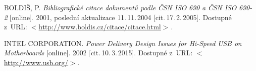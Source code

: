 \begin{literatura}{99}
	
    BOLDIŠ, P.
    \emph{Bibliografické citace dokumentů podle ČSN ISO 690 a ČSN ISO 690-2}\/ [online].
    2001, poslední aktualizace 11.\,11.\,2004 [cit.\,17.\,2.\,2005].
    Dostupné z~URL:
    \(<\)\url{http://www.boldis.cz/citace/citace.html}\(>\).
	

    INTEL CORPORATION.
    \emph{Power Delivery Design Issues for Hi-Speed USB on Motherboards}\/ [online].
    2002 [cit.\,10.\,3.\,2015].
    Dostupné z~URL:
    \(<\)\url{http://www.usb.org/}\(>\).


\end{literatura}
